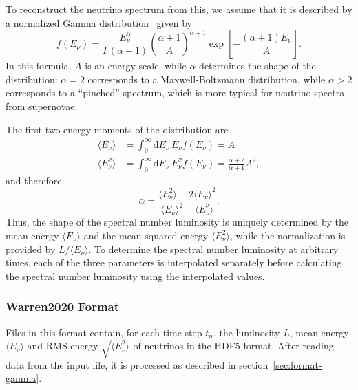 \documentclass[11pt, oneside]{article}
\renewcommand{\d}{\mathrm{d}}
\newcommand{\mean}[1]{\ensuremath{\langle #1 \rangle}}
\begin{document}
To reconstruct the neutrino spectrum from this, we assume that it is described by a normalized Gamma distribution~\cite{Keil2003,Tamborra2012} given by
\begin{equation}
f (E_\nu) = \frac{E_\nu^\alpha}{\Gamma (\alpha + 1)} \left( \frac{\alpha + 1}{A} \right)^{\alpha + 1} \exp \left[ - \frac{(\alpha + 1) E_\nu}{A} \right].
\end{equation}
In this formula, $A$ is an energy scale, while $\alpha$ determines the shape of the distribution: $\alpha = 2$ corresponds to a Maxwell-Boltzmann distribution, while $\alpha > 2$ corresponds to a “pinched” spectrum, which is more typical for neutrino spectra from supernovae.

The first two energy moments of the distribution are
\begin{align}
\mean{E_\nu}	&= \int_0^\infty \d E_\nu\, E_\nu f(E_\nu) = A\\
\mean{E_\nu^2}&= \int_0^\infty \d E_\nu\, E_\nu^2 f(E_\nu) = \frac{\alpha + 2}{\alpha + 1} A^2,
\end{align}
and therefore,
\begin{equation}
\alpha = \frac{\mean{E_\nu^2} - 2 \mean{E_\nu}^2}{\mean{E_\nu}^2 - \mean{E_\nu^2}}.
\end{equation}
Thus, the shape of the spectral number luminosity is uniquely determined by the mean energy \mean{E_\nu} and the mean squared energy \mean{E_\nu^2}, while the normalization is provided by $L / \mean{E_\nu}$.
To determine the spectral number luminosity at arbitrary times, each of the three parameters is interpolated separately before calculating the spectral number luminosity using the interpolated values.

\subsubsection{Warren2020 Format}
Files in this format contain, for each time step $t_n$, the luminosity $L$, mean energy $\mean{E_\nu}$ and RMS energy $\sqrt{\mean{E_\nu^2}}$ of neutrinos in the HDF5 format.
After reading data from the input file, it is processed as described in section~\ref{sec:format-gamma}.
\end{document}
